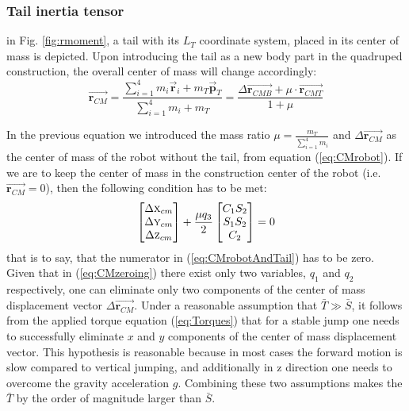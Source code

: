 \subsubsection{Tail inertia tensor}
in Fig. \ref{fig:rmoment}, a tail with its ${L_T}$ coordinate system, placed in its center of mass is depicted. Upon introducing the tail as a new body  part in the quadruped construction, the overall center of mass will change accordingly:
\begin{equation}\label{eq:CMrobotAndTail}
\vec{\textbf{r}_{CM}}=\frac{\sum_{i=1}^{4}m_i\vec{\textbf{r}}_i+m_T\vec{\textbf{p}}_T}{\sum_{i=1}^{4}m_i+m_T}= \frac{\Delta\vec{\textbf{r}_{CMB}}+\mu\cdot\vec{\textbf{r}_{CMT}}}{1+\mu}
\end{equation}


In the previous equation we introduced the mass ratio $\mu=\frac{m_T}{\sum_{i=1}^{4}m_i}$ and $\Delta\vec{\textbf{r}_{CM}}$ as the center of mass of the robot without the tail, from equation (\ref{eq:CMrobot}). If we are to keep the center of mass in the construction center of the robot (i.e. $\vec{\textbf{r}_{CM}}=0$), then the following condition has to be met:
\begin{equation}\label{eq:CMzeroing}
\begin{bmatrix}
\Delta \textsc{x}_{cm}\\ 
\Delta \textsc{y}_{cm}\\ 
\Delta \textsc{z}_{cm}
\end{bmatrix}+
\frac{\mu q_3}{2}\begin{bmatrix}
C_1S_2\\ 
S_1S_2\\ 
C_2
\end{bmatrix}=0
\end{equation}
that is to say, that the numerator in (\ref{eq:CMrobotAndTail}) has to be zero. Given that in (\ref{eq:CMzeroing}) there exist only two variables, $q_1$ and $q_2$ respectively, one can eliminate only two components of the center of mass displacement vector $\Delta \vec{\textbf{r}_{CM}}$. Under a reasonable assumption that $\bar{T}\gg \bar{S}$, it follows from the applied torque equation (\ref{eq:Torques}) that for a stable jump one needs to successfully eliminate $x$ and $y$ components of the center of mass displacement vector. This hypothesis is reasonable because in most cases the forward motion is slow compared to vertical jumping, and additionally in z direction one needs to overcome the gravity acceleration $g$. Combining these two assumptions makes the $\bar{T}$ by the order of magnitude larger than $\bar{S}$.

